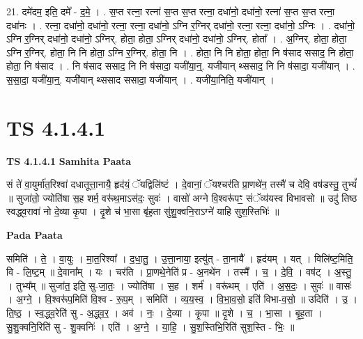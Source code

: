 \documentclass[17pt]{extarticle}
\begin{document}
21. दमे॑दम॒ इति॒ दमे᳚ - द॒मे॒ । . स॒प्त रत्ना॒ रत्ना॑ स॒प्त स॒प्त रत्ना॒ दधा॑नो॒ दधा॑नो॒ रत्ना॑ स॒प्त स॒प्त रत्ना॒ दधा॑नः । . रत्ना॒ दधा॑नो॒ दधा॑नो॒ रत्ना॒ रत्ना॒ दधा॑नो॒ ऽग्नि र॒ग्निर् दधा॑नो॒ रत्ना॒ रत्ना॒ दधा॑नो॒ ऽग्निः । . दधा॑नो॒ ऽग्नि र॒ग्निर् दधा॑नो॒ दधा॑नो॒ ऽग्निर्. होता॒ होता॒ ऽग्निर् दधा॑नो॒ दधा॑नो॒ ऽग्निर्. होता᳚ । . अ॒ग्निर्. होता॒ होता॒ ऽग्नि र॒ग्निर्. होता॒ नि नि होता॒ ऽग्नि र॒ग्निर्. होता॒ नि । . होता॒ नि नि होता॒ होता॒ नि ष॑साद ससाद॒ नि होता॒ होता॒ नि ष॑साद । . नि ष॑साद ससाद॒ नि नि ष॑सादा॒ यजी॑या॒न्॒. यजी॑यान् थ्ससाद॒ नि नि ष॑सादा॒ यजी॑यान् । . स॒सा॒दा॒ यजी॑या॒न्॒. यजी॑यान् थ्ससाद ससादा॒ यजी॑यान् । . यजी॑या॒निति॒ यजी॑यान् । \newline
\pagebreak
{}

\section{ TS 4.1.4.1 }

\textbf{TS 4.1.4.1 } \newline
\textbf{Samhita Paata} \newline

सं ते॑ वा॒युर्मा॑त॒रिश्वा॑ दधातूत्ता॒नायै॒ हृद॑यं॒ ॅयद्विलि॑ष्टं । दे॒वानां॒ ॅयश्चर॑ति प्रा॒णथे॑न॒ तस्मै॑ च देवि॒ वष॑डस्तु॒ तुभ्यं᳚ ॥ सुजा॑तो॒ ज्योति॑षा स॒ह शर्म॒ वरू॑थ॒माऽस॑दः॒ सुवः॑ । वासो॑ अग्ने वि॒श्वरू॑पꣳ॒॒ संॅव्य॑यस्व विभावसो ॥ उदु॑ तिष्ठ स्वद्ध्व॒रावा॑ नो दे॒व्या कृ॒पा । दृ॒शे च॑ भा॒सा बृ॑ह॒ता सु॑शु॒क्वनि॒राऽग्ने॑ याहि सुश॒स्तिभिः॑ ॥ \newline

\textbf{Pada Paata} \newline

समिति॑ । ते॒ । वा॒युः । मा॒त॒रिश्वा᳚ । द॒धा॒तु॒ । उ॒त्ता॒नाया॒ इत्यु॑त् - ता॒नायै᳚ । हृद॑यम् । यत् । विलि॑ष्ट॒मिति॒ वि - लि॒ष्ट॒म् ॥ दे॒वाना᳚म् । यः । चर॑ति । प्रा॒णथे॒नेति॑ प्र - अ॒नथे॑न । तस्मै᳚ । च॒ । दे॒वि॒ । वष॑ट् । अ॒स्तु॒ । तुभ्य᳚म् ॥ सुजा॑त॒ इति॒ सु-जा॒तः॒ । ज्योति॑षा । स॒ह । शर्म॑ । वरू॑थम् । एति॑ । अ॒स॒दः॒ । सुवः॑ ॥ वासः॑ । अ॒ग्ने॒ । वि॒श्वरू॑प॒मिति॑ वि॒श्व - रू॒प॒म् । समिति॑ । व्य॒य॒स्व॒ । वि॒भा॒व॒सो॒ इति॑ विभा-व॒सो॒ ॥ उदिति॑ । उ॒ । ति॒ष्ठ॒ । स्व॒द्ध्व॒रेति॑ सु - अ॒द्ध्व॒र॒ । अव॑ । नः॒ । दे॒व्या । कृ॒पा ॥ दृ॒शे । च॒ । भा॒सा । बृ॒ह॒ता । सु॒शु॒क्वनि॒रिति॑ सु - शु॒क्वनिः॑ । एति॑ । अ॒ग्ने॒ । या॒हि॒ । सु॒श॒स्तिभि॒रिति॑ सुश॒स्ति - भिः॒ ॥  \newline
\end{document}
